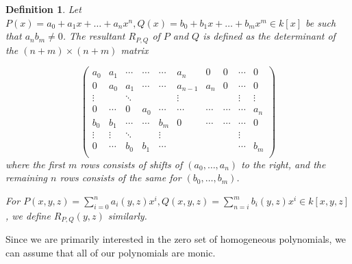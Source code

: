 \documentclass{article}
\newtheorem*{definition}{Definition}
\theoremstyle{remark}
\begin{document}
\begin{definition}
Let $P(x)=a_0 +a_1 x +\ldots + a_n x^n, Q(x)=b_0 +b_1 x +\ldots + b_m x^m\in k[x]$ be such that $a_n b_m\neq 0$. The \textit{resultant} $R_{P,Q}$ of $P$ and $Q$ is defined as the determinant of the $(n+m) \times (n+m)$ matrix

\[\begin{pmatrix}
  a_{0}   & a_{1} & \cdots & \cdots & \cdots & a_{n}     & 0       & 0           & \cdots & 0         \\
       0     & a_{0} &  a_{1}  & \cdots & \cdots & a_{n-1} & a_{n} & 0         & \cdots  & 0          \\
  \vdots  &         & \ddots &           &            & \vdots   &           & \           & \vdots & \vdots  \\
  0         &  \cdots &       0    & a_{0}  & \cdots &\cdots    &\cdots  &\cdots &\cdots   & a_{n}     \\
  b _{0}   & b_{1} & \cdots & \cdots &  b_{m}  & 0          & \cdots & \cdots & \cdots & 0         \\
   \vdots  & \vdots & \ddots &         & \vdots   &              &          &             & \vdots               \\
   0         &  \cdots  &  b_{0} & b_{1}  & \cdots &             &           &           &\cdots   & b_{m}     \\
 \end{pmatrix}\]
 where the first $m$ rows consists of shifts of $(a_0, \ldots , a_n)$ to the right, and the remaining $n$ rows consists of the same for $(b_0, \ldots , b_m)$. 

For $P(x,y,z)= \sum_{i=0}^{n} a_{i}(y,z)x^i,Q(x,y,z)=\sum_{n=i}^{m} b_{i}(y,z)x^i \in k[x,y,z]$, we define $R_{P,Q}(y,z)$ similarly.
\end{definition}
Since we are primarily interested in the zero set of homogeneous polynomials, we can assume that all of our polynomials are monic.
\end{document}
